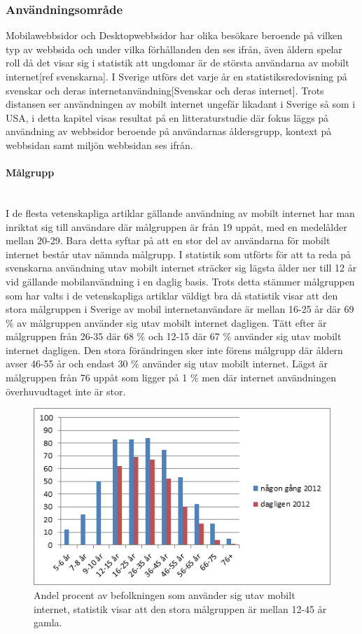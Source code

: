 \documentclass[11pt]{article}
\begin{document}
\subsubsection{Användningsområde}

Mobilawebbsidor och Desktopwebbsidor har olika besökare beroende på vilken typ av webbsida och under vilka förhållanden den ses ifrån, även åldern spelar roll då det visar sig i statistik att ungdomar är de största användarna av mobilt internet[ref svenskarna]. I Sverige utförs det varje år en statistiksredovisning på svenskar och deras internetanvändning[Svenskar och deras internet]. Trots distansen ser användningen av mobilt internet ungefär likadant i Sverige så som i USA, i detta kapitel visas resultat på en litteraturstudie där fokus läggs på användning av webbsidor beroende på användarnas åldersgrupp, kontext på webbsidan samt miljön webbsidan ses ifrån.

\paragraph{Målgrupp}\mbox{} \\

I de flesta vetenskapliga artiklar gällande användning av mobilt internet har man inriktat sig till användare där målgruppen är från 19 uppåt, med en medelålder mellan 20-29. Bara detta syftar på att en stor del av användarna för mobilt internet består utav nämnda målgrupp. I statistik som utförts för att ta reda på svenskarna användning utav mobilt internet sträcker sig lägsta ålder ner till 12 år vid gällande mobilanvändning i en daglig basis. Trots detta stämmer målgruppen som har valts i de vetenskapliga artiklar väldigt bra då statistik visar att den stora målgruppen i Sverige av mobil internetanvändare är mellan 16-25 år där 69 \% av målgruppen använder sig utav mobilt internet dagligen. Tätt efter är målgruppen från 26-35 där 68 \% och 12-15 där 67 \% använder sig utav mobilt internet dagligen. Den stora förändringen sker inte förens målgrupp där åldern avser 46-55 år och endast 30 \% använder sig utav mobilt internet. Lägst är målgruppen från 76 uppåt som ligger på 1 \% men där internet användningen överhuvudtaget inte är stor.
\\
\setcounter{figure}{3}
\begin{figure}[H]
  \centering
    \includegraphics[scale=0.8]{pics/statistikalder.png}
    \caption{Andel procent av befolkningen som använder sig utav mobilt internet, statistik visar att den stora målgruppen är mellan 12-45 år gamla.}
\end{figure}
\end{document}
